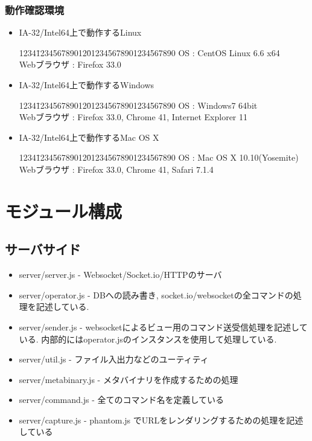 \documentclass[a4paper,10pt,oneside]{jsbook}
\begin{document}
\subsection*{動作確認環境}
\begin{itemize}
	\item IA-32/Intel64上で動作するLinux
	\begin{tabbing}
		1234\=123456789012\=012345678901234567890\kill
		\> OS \> : CentOS Linux 6.6 x64 \\ 
		\> Webブラウザ \> : Firefox 33.0
	\end{tabbing}
	\item IA-32/Intel64上で動作するWindows
	\begin{tabbing}
		1234\=123456789012\=012345678901234567890\kill
		\> OS \> : Windows7 64bit \\
		\> Webブラウザ \> : Firefox 33.0, Chrome 41, Internet Explorer 11
	\end{tabbing}
	\item IA-32/Intel64上で動作するMac OS X
	\begin{tabbing}
		1234\=123456789012\=012345678901234567890\kill
		\> OS \> : Mac OS X 10.10(Yosemite)\\
		\> Webブラウザ \> : Firefox 33.0, Chrome 41, Safari 7.1.4
	\end{tabbing}
\end{itemize}

\chapter{モジュール構成}
\section{サーバサイド}
\begin{itemize}
\item server/server.js  - Websocket/Socket.io/HTTPのサーバ
\item server/operator.js - DBへの読み書き, socket.io/websocketの全コマンドの処理を記述している.
\item server/sender.js - websocketによるビュー用のコマンド送受信処理を記述している. 内部的にはoperator.jsのインスタンスを使用して処理している.
\item server/util.js - ファイル入出力などのユーティティ
\item server/metabinary.js - メタバイナリを作成するための処理
\item server/command.js - 全てのコマンド名を定義している
\item server/capture.js - phantom.js でURLをレンダリングするための処理を記述している
\end{itemize}
\end{document}
